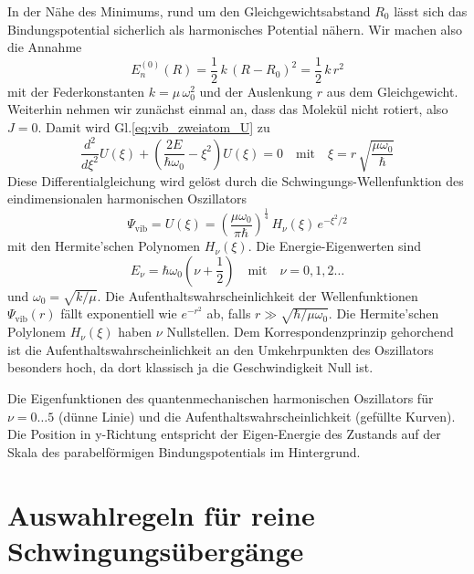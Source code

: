 In der Nähe des Minimums, rund um den Gleichgewichtsabstand $R_0$ lässt sich das Bindungspotential sicherlich als harmonisches Potential nähern. Wir machen also die Annahme
\begin{equation}
E_n^{(0)}(R)  = \frac{1}{2} \, k \, (R - R_0 )^2 = \frac{1}{2} \, k \, r^2 
\end{equation}
mit der Federkonstanten $k = \mu \, \omega_0^2$ und der Auslenkung $r$ aus dem Gleichgewicht. Weiterhin nehmen wir zunächst einmal an, dass das Molekül nicht rotiert, also $J=0$.  Damit wird Gl.\ref{eq:vib_zweiatom_U} zu
\begin{equation}
 \frac{d^2}{d \xi^2} U(\xi) + \left( \frac{2 E }{\hbar \omega_0}  - \xi^2  \right) U(\xi) = 0 \quad \text{mit} \quad \xi =  r \, \sqrt{\frac{\mu \omega_0}{\hbar}  }
\end{equation}
Diese Differentialgleichung wird gelöst durch die Schwingungs-Wellenfunktion des eindimensionalen harmonischen Oszillators
\begin{equation}
\Psi_\text{vib} =  U(\xi) = \left(\frac{\mu \omega_0}{\pi \hbar} \right)^{\frac{1}{4}} \,
 H_\nu(\xi) \, e^{- \xi^2 /2}
\end{equation}
mit den Hermite'schen Polynomen $H_\nu(\xi)$.
Die Energie-Eigenwerten sind
\begin{equation}
E_\nu = \hbar \omega_0 \left(\nu + \frac{1}{2} \right) \quad \text{mit} \quad \nu = 0, 1, 2 \dots
\end{equation}
und $\omega_0 = \sqrt{k / \mu}$. Die Aufenthaltswahrscheinlichkeit der Wellenfunktionen $\Psi_\text{vib}(r)$ fällt exponentiell wie $e^{-r^2}$ ab, falls $r \gg \sqrt{\hbar / \mu \omega_0}$. Die Hermite'schen Polylonem $H_\nu(\xi)$ haben $\nu$ Nullstellen. Dem Korrespondenzprinzip gehorchend ist die 
Aufenthaltswahrscheinlichkeit an den Umkehrpunkten des Oszillators besonders hoch, da dort klassisch ja die Geschwindigkeit Null ist.


\begin{marginfigure}
\caption{Die Eigenfunktionen des quantenmechanischen harmonischen Oszillators für $\nu = 0 \dots 5$ (dünne Linie) und die Aufenthaltswahrscheinlichkeit (gefüllte Kurven). Die Position in y-Richtung entspricht der Eigen-Energie des Zustands auf der Skala des parabelförmigen Bindungspotentials im Hintergrund.
\label{fig:vib_1d_WF}}
\end{marginfigure}


\section{Auswahlregeln für reine Schwingungsübergänge}

